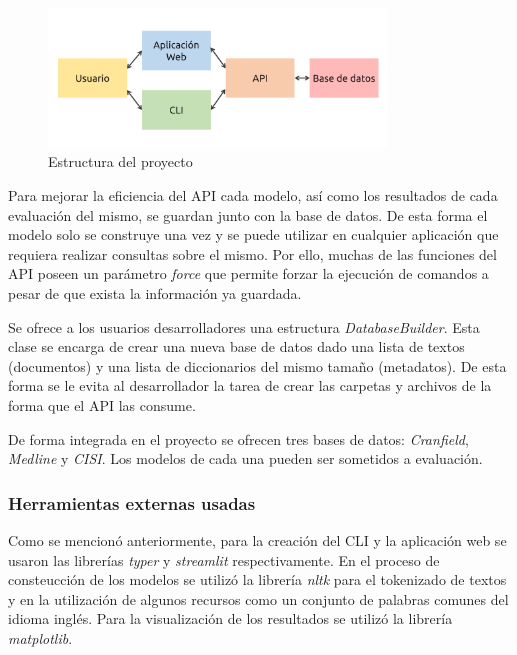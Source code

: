 \begin{figure}[htb]%
	\begin{center}
		\includegraphics[width=0.8\textwidth]{./sri_03.png}
	\end{center}
	\caption{Estructura del proyecto}
	\label{fig:project-structure}
\end{figure}

Para mejorar la eficiencia del API cada modelo, así como los resultados de cada
evaluación del mismo, se guardan junto con la base de datos. De esta forma el 
modelo solo se construye una vez y se puede utilizar en cualquier aplicación
que requiera realizar consultas sobre el mismo. Por ello, muchas de las funciones
del API poseen un parámetro \emph{force} que permite forzar la ejecución de
comandos a pesar de que exista la información ya guardada.

Se ofrece a los usuarios desarrolladores una estructura \emph{DatabaseBuilder}.
Esta clase se encarga de crear una nueva base de datos dado una lista de textos
(documentos) y una lista de diccionarios del mismo tamaño (metadatos). De
esta forma se le evita al desarrollador la tarea de crear las carpetas y archivos
de la forma que el API las consume.

De forma integrada en el proyecto se ofrecen tres bases de datos: \emph{Cranfield},
\emph{Medline} y \emph{CISI}. Los modelos de cada una pueden ser sometidos a 
evaluación.

\subsubsection{Herramientas externas usadas}\label{sec:external-tools}

Como se mencionó anteriormente, para la creación del CLI y la aplicación web se
usaron las librerías \emph{typer} y \emph{streamlit} respectivamente. En el
proceso de consteucción de los modelos se utilizó la librería \emph{nltk} para
el tokenizado de textos y en la utilización de algunos recursos como un
conjunto de palabras comunes del idioma inglés. Para la visualización de los
resultados se utilizó la librería \emph{matplotlib}.
